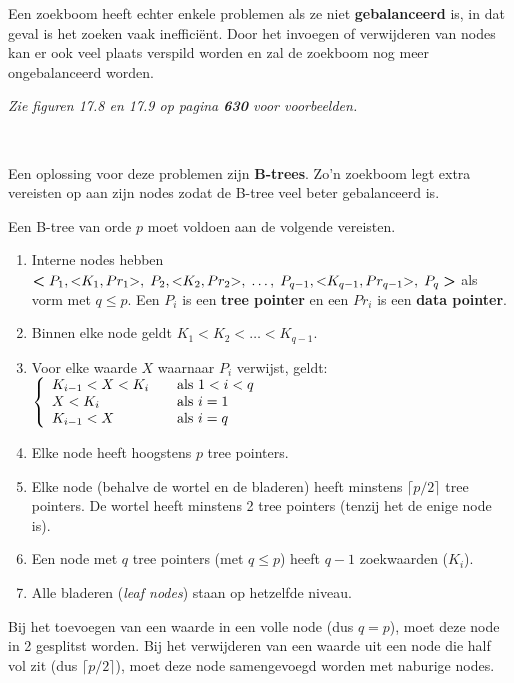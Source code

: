 Een zoekboom heeft echter enkele problemen als ze niet \textbf{gebalanceerd} is, in dat geval is het zoeken vaak ineffici\"ent. Door het invoegen of verwijderen van nodes kan er ook veel plaats verspild worden en zal de zoekboom nog meer ongebalanceerd worden.

\textit{Zie figuren 17.8 en 17.9 op pagina \textbf{630} voor voorbeelden.}

~

\noindent Een oplossing voor deze problemen zijn \textbf{B-trees}. Zo'n zoekboom legt extra vereisten op aan zijn nodes zodat de B-tree veel beter gebalanceerd is.

Een B-tree van orde $p$ moet voldoen aan de volgende vereisten.
\begin{enumerate}
	\item Interne nodes hebben $\textbf{\textless} \; P_1, \text{\textless} K_1, Pr_1 \text{\textgreater}, \; P_2, \text{\textless} K_2, Pr_2 \text{\textgreater}, \;\dots, \; P_{q-1}, \text{\textless} K_{q-1}, Pr_{q-1} \text{\textgreater}, \; P_q \; \textbf{\textgreater}$ als vorm met $q \leqslant p$. Een $P_i$ is een \textbf{tree pointer} en een $Pr_i$ is een \textbf{data pointer}.
	
	\item Binnen elke node geldt $K_1 < K_2 < \dots < K_{q-1}$.
	
	\vspace{-3mm}
	\item Voor elke waarde $X$ waarnaar $P_i$ verwijst, geldt: $
	\left\{
		\begin{array}{l l}
			K_{i-1} < X < K_i	& \quad \text{als } 1<i<q\\
			X < K_i				& \quad \text{als }i=1\\
			K_{i-1} < X			& \quad \text{als }i=q\\
		\end{array}
	\right.$

	\vspace{-3mm}
	\item Elke node heeft hoogstens $p$ tree pointers.
	
	\item Elke node (behalve de wortel en de bladeren) heeft minstens $\lceil p/2 \rceil$ tree pointers. De wortel heeft minstens 2 tree pointers (tenzij het de enige node is).
	
	\item Een node met $q$ tree pointers (met $q \leq p$) heeft $q-1$ zoekwaarden ($K_i$).
	
	\item Alle bladeren (\textit{leaf nodes}) staan op hetzelfde niveau.
\end{enumerate}\vspace{1mm}
Bij het toevoegen van een waarde in een volle node (dus $q=p$), moet deze node in 2 gesplitst worden. Bij het verwijderen van een waarde uit een node die half vol zit (dus $\lceil p/2 \rceil$), moet deze node samengevoegd worden met naburige nodes.


